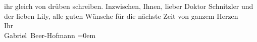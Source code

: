 \begin{ledgroupsized}[t]{13cm}
                    ihr gleich von drüben schreiben.\pend
           \pstart
           Inzwischen, Ihnen, lieber Doktor Schnitzler und der lieben Lily, alle guten Wünsche für die nächste Zeit\pend
           \pstart
           von ganzem Herzen{\\[\baselineskip]}Ihr{\\[\baselineskip]}\spacefill\mbox{Gabriel Beer-Hofmann}\pend
           \leftskip=0em{}\endnumbering{}\end{ledgroupsized}  \newcommand{\dateiname}{L02479}\newcommand{\titel}{Gabriel Beer-Hofmann an Arthur Schnitzler, 12. 10. 1926}\newcommand{\editorInnen}{Martin Anton Müller und Gerd-Hermann Susen}
      